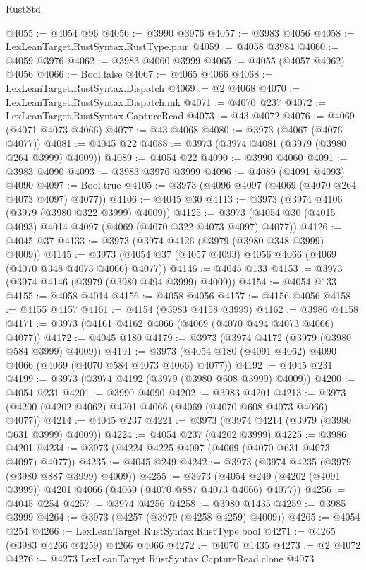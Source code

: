 \begin{lexlean}{RustStd}
\begin{coremodule}
{\begin{coremodule}
{{{{{{{{{{{{{{{{{{{{{{{{{{{{{{{{{{{{{{{{{{{{{{{{{{{{{{{{{{{{{{{{{{{{@4055 := @4054 @96
@4056 := @3990 @3976
@4057 := @3983 @4056
@4058 := LexLeanTarget.RustSyntax.RustType.pair
@4059 := @4058 @3984
@4060 := @4059 @3976
@4062 := @3983 @4060 @3999
@4065 := @4055 (@4057 @4062) @4056
@4066 := Bool.false
@4067 := @4065 @4066
@4068 := LexLeanTarget.RustSyntax.Dispatch
@4069 := @2 @4068
@4070 := LexLeanTarget.RustSyntax.Dispatch.mk
@4071 := @4070 @237
@4072 := LexLeanTarget.RustSyntax.CaptureRead
@4073 := @43 @4072
@4076 := @4069 (@4071 @4073 @4066)
@4077 := @43 @4068
@4080 := @3973 (@4067 (@4076 @4077))
@4081 := @4045 @22
@4088 := @3973 (@3974 @4081 (@3979 (@3980 @264 @3999) @4009))
@4089 := @4054 @22
@4090 := @3990 @4060
@4091 := @3983 @4090
@4093 := @3983 @3976 @3999
@4096 := @4089 (@4091 @4093) @4090
@4097 := Bool.true
@4105 := @3973 (@4096 @4097 (@4069 (@4070 @264 @4073 @4097) @4077))
@4106 := @4045 @30
@4113 := @3973 (@3974 @4106 (@3979 (@3980 @322 @3999) @4009))
@4125 := @3973 (@4054 @30 (@4015 @4093) @4014 @4097 (@4069 (@4070 @322 @4073 @4097) @4077))
@4126 := @4045 @37
@4133 := @3973 (@3974 @4126 (@3979 (@3980 @348 @3999) @4009))
@4145 := @3973 (@4054 @37 (@4057 @4093) @4056 @4066 (@4069 (@4070 @348 @4073 @4066) @4077))
@4146 := @4045 @133
@4153 := @3973 (@3974 @4146 (@3979 (@3980 @494 @3999) @4009))
@4154 := @4054 @133
@4155 := @4058 @4014
@4156 := @4058 @4056
@4157 := @4156 @4056
@4158 := @4155 @4157
@4161 := @4154 (@3983 @4158 @3999)
@4162 := @3986 @4158
@4171 := @3973 (@4161 @4162 @4066 (@4069 (@4070 @494 @4073 @4066) @4077))
@4172 := @4045 @180
@4179 := @3973 (@3974 @4172 (@3979 (@3980 @584 @3999) @4009))
@4191 := @3973 (@4054 @180 (@4091 @4062) @4090 @4066 (@4069 (@4070 @584 @4073 @4066) @4077))
@4192 := @4045 @231
@4199 := @3973 (@3974 @4192 (@3979 (@3980 @608 @3999) @4009))
@4200 := @4054 @231
@4201 := @3990 @4090
@4202 := @3983 @4201
@4213 := @3973 (@4200 (@4202 @4062) @4201 @4066 (@4069 (@4070 @608 @4073 @4066) @4077))
@4214 := @4045 @237
@4221 := @3973 (@3974 @4214 (@3979 (@3980 @631 @3999) @4009))
@4224 := @4054 @237 (@4202 @3999)
@4225 := @3986 @4201
@4234 := @3973 (@4224 @4225 @4097 (@4069 (@4070 @631 @4073 @4097) @4077))
@4235 := @4045 @249
@4242 := @3973 (@3974 @4235 (@3979 (@3980 @887 @3999) @4009))
@4255 := @3973 (@4054 @249 (@4202 (@4091 @3999)) @4201 @4066 (@4069 (@4070 @887 @4073 @4066) @4077))
@4256 := @4045 @254
@4257 := @3974 @4256
@4258 := @3980 @1435
@4259 := @3985 @3999
@4264 := @3973 (@4257 (@3979 (@4258 @4259) @4009))
@4265 := @4054 @254
@4266 := LexLeanTarget.RustSyntax.RustType.bool
@4271 := @4265 (@3983 @4266 @4259) @4266 @4066
@4272 := @4070 @1435
@4273 := @2 @4072
@4276 := @4273 LexLeanTarget.RustSyntax.CaptureRead.clone @4073
}}}}}}}}}}}}}}}}}}}}}}}}}}}}}}}}}}}}}}}}}}}}}}}}}}}}}}}}}}}}}}}}}}}}
\end{coremodule}}
\end{coremodule}
\end{lexlean}

